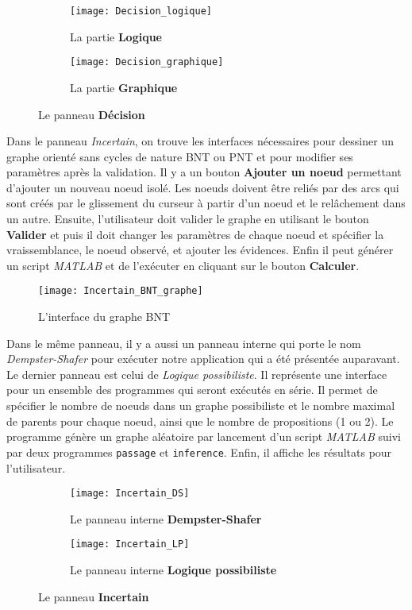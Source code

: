 \begin{figure}[H]
\begin{subfigure}{0.49\textwidth}
\texttt{[image: Decision\_logique]}
\caption{La partie \textbf{Logique}}
\end{subfigure}
\hfill
\begin{subfigure}{0.49\textwidth}
\texttt{[image: Decision\_graphique]}
\caption{La partie \textbf{Graphique}}
\end{subfigure}
\caption{Le panneau \textbf{Décision}}
\end{figure}

\vspace*{1.5em}
Dans le panneau \textit{Incertain}, on trouve les interfaces nécessaires pour dessiner un graphe orienté sans
cycles de nature BNT ou PNT et pour modifier ses paramètres après la validation. Il y a un bouton \textbf{Ajouter un noeud}
permettant d'ajouter un nouveau noeud isolé. Les noeuds doivent être reliés par des arcs qui sont créés par le
glissement du curseur à partir d'un noeud et le relâchement dans un autre. Ensuite, l'utilisateur doit valider le graphe
en utilisant le bouton \textbf{Valider} et puis il doit changer les paramètres de chaque noeud et spécifier la vraissemblance,
le noeud observé, et ajouter les évidences. Enfin il peut générer un script \textit{MATLAB} et de l'exécuter en cliquant
sur le bouton \textbf{Calculer}.
\vspace*{3em}

\begin{figure}[H]
\centering
\texttt{[image: Incertain\_BNT\_graphe]}
\caption{L'interface du graphe BNT}
\end{figure}
\vspace*{2em}

Dans le même panneau, il y a aussi un panneau interne qui porte le nom \textit{Dempster-Shafer} pour exécuter
notre application \appname qui a été présentée auparavant. Le dernier panneau est celui de \textit{Logique possibiliste}.
Il représente une interface pour un ensemble des programmes qui seront exécutés en série. Il permet de spécifier le nombre
de noeuds dans un graphe possibiliste et le nombre maximal de parents pour chaque noeud, ainsi que le nombre de propositions
(1 ou 2). Le programme génère un graphe aléatoire par lancement d'un script \textit{MATLAB} suivi par deux programmes
\texttt{passage} et \texttt{inference}. Enfin, il affiche les résultats pour l'utilisateur.

\begin{figure}[H]
\begin{subfigure}{0.49\textwidth}
\texttt{[image: Incertain\_DS]}
\caption{Le panneau interne \textbf{Dempster-Shafer}}
\end{subfigure}
\begin{subfigure}{0.49\textwidth}
\hfill
\texttt{[image: Incertain\_LP]}
\caption{Le panneau interne \textbf{Logique possibiliste}}
\end{subfigure}
\caption{Le panneau \textbf{Incertain}}
\end{figure}

